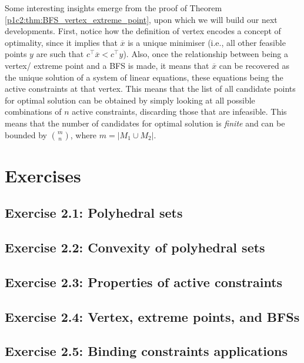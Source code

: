 Some interesting insights emerge from the proof of Theorem \ref{p1c2:thm:BFS_vertex_extreme_point}, upon which we will build our next developments. First, notice how the definition of vertex encodes a concept of optimality, since it implies that $\overline{x}$ is a unique minimiser (i.e., all other feasible points $y$ are such that $c^\top\overline{x} < c^\top y$). Also, once the relationship between being a vertex/ extreme point and a BFS is made, it means that $\overline{x}$ can be recovered as the unique solution of a system of linear equations, these equations being the active constraints at that vertex. This means that the list of all candidate points for optimal solution can be obtained by simply looking at all possible combinations of $n$ active constraints, discarding those that are infeasible. This means that the number of candidates for optimal solution is \emph{finite} and can be bounded by $\binom{m}{n}$, where $m=| M_1 \cup M_2 |$. 


\section{Exercises}

\subsection*{Exercise 2.1: Polyhedral sets}


\subsection*{Exercise 2.2: Convexity of polyhedral sets}


\subsection*{Exercise 2.3: Properties of active constraints}


\subsection*{Exercise 2.4: Vertex, extreme points, and BFSs}


\subsection*{Exercise 2.5: Binding constraints applications} 


 

